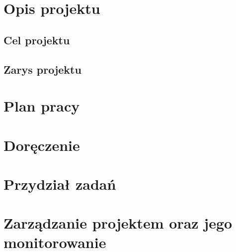 


                   

\chapter{Opis projektu}
\section{Cel projektu}
  

\section{Zarys projektu}
  

\chapter{Plan pracy}

\chapter{Doręczenie}

\chapter{Przydział zadań}




\chapter{Zarządzanie projektem oraz jego monitorowanie}








